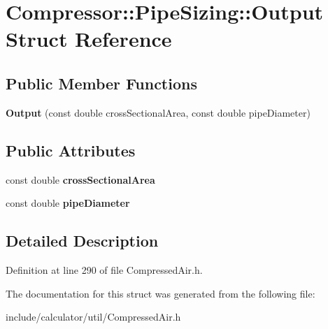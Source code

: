 \hypertarget{struct_compressor_1_1_pipe_sizing_1_1_output}{}\section{Compressor\+:\+:Pipe\+Sizing\+:\+:Output Struct Reference}
\label{struct_compressor_1_1_pipe_sizing_1_1_output}
\subsection*{Public Member Functions}
\begin{DoxyCompactItemize}
\item 
\mbox{\label{struct_compressor_1_1_pipe_sizing_1_1_output_a30c100e28cf3648c7d0295e6e534dfad}} 
{\bfseries Output} (const double cross\+Sectional\+Area, const double pipe\+Diameter)
\end{DoxyCompactItemize}
\subsection*{Public Attributes}
\begin{DoxyCompactItemize}
\item 
\mbox{\label{struct_compressor_1_1_pipe_sizing_1_1_output_ad609e5f5deba43dfb986ece30d93aa27}} 
const double {\bfseries cross\+Sectional\+Area}
\item 
\mbox{\label{struct_compressor_1_1_pipe_sizing_1_1_output_ab3a3dcae4259383d06f563a39e617559}} 
const double {\bfseries pipe\+Diameter}
\end{DoxyCompactItemize}


\subsection{Detailed Description}


Definition at line 290 of file Compressed\+Air.\+h.



The documentation for this struct was generated from the following file\+:\begin{DoxyCompactItemize}
\item 
include/calculator/util/Compressed\+Air.\+h\end{DoxyCompactItemize}
